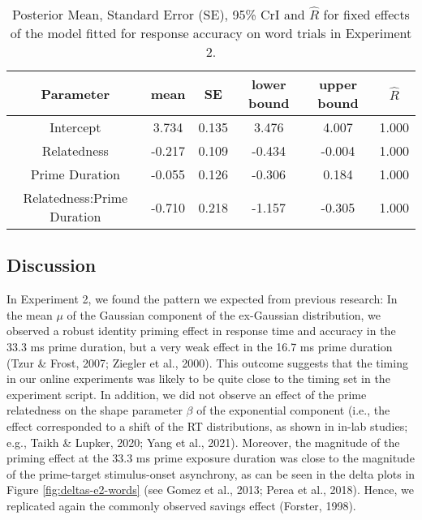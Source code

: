 \documentclass[
  english,
  man,floatsintext]{apa6}
\begin{document}
\begin{table}[H]

\begin{center}
\begin{threeparttable}

\caption{\label{tab:exp2-acc-blmm-table}Posterior Mean, Standard Error (SE), 95\% CrI and \(\hat{R}\) for fixed effects of the model fitted for response accuracy on word trials in Experiment 2.}

\small{

\begin{tabular}{cccccc}
\toprule
Parameter & \multicolumn{1}{c}{mean} & \multicolumn{1}{c}{SE} & \multicolumn{1}{c}{lower bound} & \multicolumn{1}{c}{upper bound} & \multicolumn{1}{c}{$\hat{R}$}\\
\midrule
Intercept & 3.734 & 0.135 & 3.476 & 4.007 & 1.000\\
Relatedness & -0.217 & 0.109 & -0.434 & -0.004 & 1.000\\
Prime Duration & -0.055 & 0.126 & -0.306 & 0.184 & 1.000\\
Relatedness:Prime Duration & -0.710 & 0.218 & -1.157 & -0.305 & 1.000\\
\bottomrule
\end{tabular}

}

\end{threeparttable}
\end{center}

\end{table}

\hypertarget{discussion-1}{%
\subsection{Discussion}\label{discussion-1}}

In Experiment 2, we found the pattern we expected from previous research: In the mean \(\mu\) of the Gaussian component of the ex-Gaussian distribution, we observed a robust identity priming effect in response time and accuracy in the 33.3 ms prime duration, but a very weak effect in the 16.7 ms prime duration (Tzur \& Frost, 2007; Ziegler et al., 2000). This outcome suggests that the timing in our online experiments was likely to be quite close to the timing set in the experiment script. In addition, we did not observe an effect of the prime relatedness on the shape parameter \(\beta\) of the exponential component (i.e., the effect corresponded to a shift of the RT distributions, as shown in in-lab studies; e.g., Taikh \& Lupker, 2020; Yang et al., 2021). Moreover, the magnitude of the priming effect at the 33.3 ms prime exposure duration was close to the magnitude of the prime-target stimulus-onset asynchrony, as can be seen in the delta plots in Figure \ref{fig:deltas-e2-words} (see Gomez et al., 2013; Perea et al., 2018). Hence, we replicated again the commonly observed savings effect (Forster, 1998).
\end{document}

